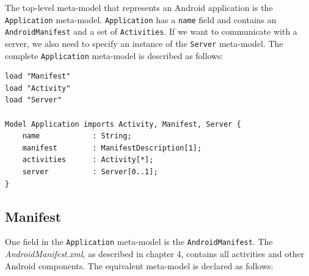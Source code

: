 The top-level meta-model that represents an Android application is the \texttt{Application} meta-model. \texttt{Application} has a \texttt{name} field and contains an \texttt{AndroidManifest} and a set of \texttt{Activities}. If we want to communicate with a server, we also need to specify an instance of the \texttt{Server} meta-model. The complete \texttt{Application} meta-model is described as follows:

\begin{lstlisting}[label=application-mm,caption=Application meta-model, captionpos=t]
load "Manifest"
load "Activity"
load "Server"

Model Application imports Activity, Manifest, Server {
	name			: String;
	manifest		: ManifestDescription[1];
	activities		: Activity[*];
	server 			: Server[0..1];
}
\end{lstlisting}

\subsection{Manifest}

One field in the \texttt{Application} meta-model is the \texttt{AndroidManifest}. The \textit{AndroidManifest.xml}, as described in chapter 4, contains all activities and other Android components. The equivalent meta-model is declared as follows:

